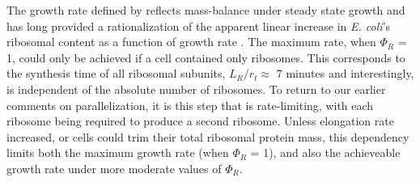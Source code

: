The growth rate defined by  reflects
mass-balance under steady state growth and has long provided a rationalization
of the apparent linear increase in \textit{E. coli}'s ribosomal content as a
function of growth rate \citep{goldberger1979, scott2010}. The maximum rate,
when $\Phi_R$ = 1, could only be achieved if a cell contained only ribosomes.
This corresponds to the synthesis time of all ribosomal subunits, $L_R/ r_t
\approx$ 7 minutes \citep{dill2011} and interestingly, is independent of the
absolute number of ribosomes. To return to our earlier comments on
parallelization, it is this step that is rate-limiting, with each ribosome being
required to produce a second ribosome. Unless elongation rate increased, or
cells could trim their total ribosomal protein mass, this dependency limits both
the maximum growth rate (when $\Phi_R$ = 1), and also the achieveable growth
rate under more moderate values of $\Phi_R$.

